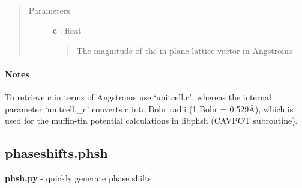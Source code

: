 \documentclass[letterpaper,10pt,english]{sphinxmanual}
\begin{document}
\begin{fulllineitems}
\begin{fulllineitems}
\label{modules:phaseshifts.model.Unitcell.set_c}~\begin{quote}\begin{description}
\item[{Parameters}] \leavevmode
\textbf{c} : float
\begin{quote}

The magnitude of the in-plane lattice vector in Angstroms
\end{quote}

\end{description}\end{quote}
\paragraph{Notes}

To retrieve c in terms of Angstroms use `unitcell.c', whereas the
internal parameter `unitcell.\_c' converts c into Bohr radii 
(1 Bohr = 0.529Å), which is used for the muffin-tin potential
calculations in libphsh (CAVPOT subroutine).

\end{fulllineitems}


\begin{fulllineitems}
\label{modules:phaseshifts.model.Unitcell.set_gamma}
\end{fulllineitems}


\begin{fulllineitems}
\label{modules:phaseshifts.model.Unitcell.set_vectors}
\end{fulllineitems}


\end{fulllineitems}



\subsection{phaseshifts.phsh}
\label{modules:phaseshifts-phsh}\label{modules:module-phaseshifts.phsh}
\textbf{phsh.py} - quickly generate phase shifts
\end{document}
